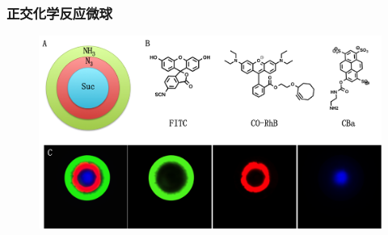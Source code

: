 \documentclass{beamer}
\begin{document}
\begin{frame}
  \frametitle{正交化学反应微球}
  \begin{figure}
    \begin{center}
      \includegraphics[width=0.9\linewidth]{figures/ch3/Figure4.png}
    \end{center}
  \end{figure}
\end{frame}
\end{document}
